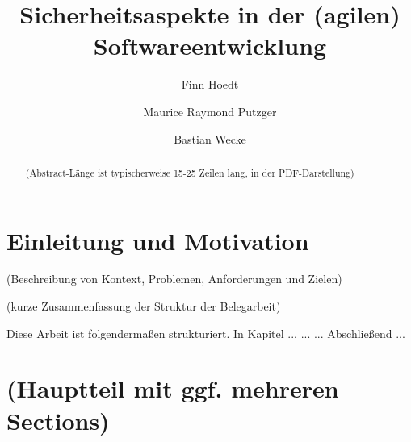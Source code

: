\documentclass[acmtog]{acmart}
\begin{document}
\title{Sicherheitsaspekte in der (agilen) Softwareentwicklung}

\author{Finn Hoedt}
\author{Maurice Raymond Putzger}
\authornotemark[1]
\author{Bastian Wecke}
\authornotemark[1]
\renewcommand{\shortauthors}{Hoedt, Putzger und Wecke}

\begin{abstract}
  (Abstract-Länge ist typischerweise 15-25 Zeilen lang, in der PDF-Darstellung) 
  
  
\end{abstract}

\maketitle

\section{Einleitung und Motivation}

(Beschreibung von Kontext, Problemen, Anforderungen und Zielen) 



(kurze Zusammenfassung der Struktur der Belegarbeit)

Diese Arbeit ist folgendermaßen strukturiert. 
In Kapitel ... 
...
...
Abschließend ...



\section{(Hauptteil mit ggf. mehreren Sections)}
\end{document}
